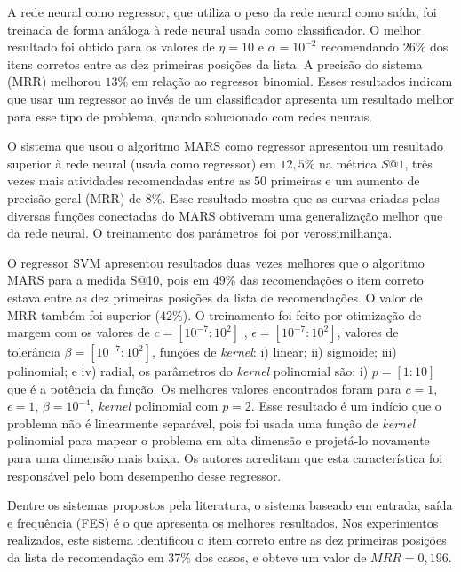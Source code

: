 \documentclass[10pt]{article}
\begin{document}
A rede neural como regressor, que utiliza o peso da rede neural como saída, foi treinada de forma análoga à rede neural usada como classificador. O melhor resultado foi obtido para os valores de \(\eta = 10\) e \(\alpha = 10^{-2}\) recomendando \(26\%\) dos itens corretos entre as dez primeiras posições da lista. A precisão do sistema (MRR) melhorou \(13\%\) em relação ao regressor binomial. Esses resultados indicam que usar um regressor ao invés de um classificador apresenta um resultado melhor para esse tipo de problema, quando solucionado com redes neurais.

O sistema que usou o algoritmo MARS como regressor apresentou um resultado superior à rede neural (usada como regressor) em \(12,5\%\) na métrica \(S@1\), três vezes mais atividades recomendadas entre as \(50\) primeiras e um aumento de precisão geral (MRR) de \(8\%\). Esse resultado mostra que as curvas criadas pelas diversas funções conectadas do MARS obtiveram uma generalização melhor que da rede neural. O treinamento dos parâmetros foi por verossimilhança.

O regressor SVM apresentou resultados duas vezes melhores que o algoritmo MARS para a medida S@10, pois em \(49\%\) das recomendações o item correto estava entre as dez primeiras posições da lista de recomendações. O valor de MRR também foi superior (\(42\%\)). O treinamento foi feito por otimização de margem com os valores de \(c = [10^{-7}:10^{2}]\) , \(\epsilon = [10^{-7}:10^{2}]\), valores de tolerância \(\beta = [10^{-7}:10^{2}]\), funções de \emph{kernel}: i) linear; ii) sigmoide; iii) polinomial; e iv) radial, os parâmetros do \emph{kernel} polinomial são: i) \(p = [1:10]\) que é a potência da função. Os melhores valores encontrados foram para \(c = 1\), \(\epsilon = 1\), \(\beta = 10^{-4}\), \emph{kernel} polinomial com \(p = 2\). Esse resultado é um indício que o problema não é linearmente separável, pois foi usada uma função de \emph{kernel} polinomial para mapear o problema em alta dimensão e projetá-lo novamente para uma dimensão mais baixa. Os autores acreditam que esta característica foi responsável pelo bom desempenho desse regressor.

Dentre os sistemas propostos pela literatura, o sistema baseado em entrada, saída e frequência (FES) \cite{Wang2008} é o que apresenta os melhores resultados. Nos experimentos realizados, este sistema identificou o item correto entre as dez primeiras posições da lista de recomendação em \(37\%\) dos casos, e obteve um valor de \(MRR = 0,196\).
\end{document}
